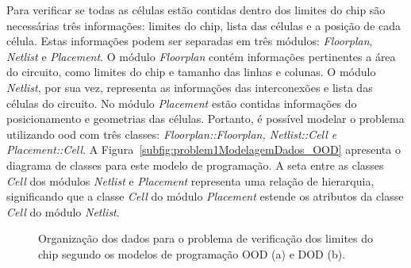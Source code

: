 Para verificar se todas as células estão contidas dentro dos limites do chip são necessárias três informações: limites do chip, lista das células e a posição de cada célula.
Estas informações podem ser separadas em três módulos: \textit{Floorplan}, \textit{Netlist} e \textit{Placement}.
O módulo \textit{Floorplan} contém informações pertinentes a área do circuito, como limites do chip e tamanho das linhas e colunas.
O módulo \textit{Netlist}, por sua vez, representa as informações das interconexões e lista das células do circuito.
No módulo \textit{Placement} estão contidas informações do posicionamento e geometrias das células.
Portanto, é possível modelar o problema utilizando \ac{ood} com três classes: \textit{Floorplan::Floorplan, Netlist::Cell e Placement::Cell}.
A Figura~\ref{subfig:problem1ModelagemDados_OOD} apresenta o diagrama de classes para este modelo de programação.
A seta entre as classes \textit{Cell} dos módulos \textit{Netlist} e \textit{Placement} representa uma relação de hierarquia, significando que a classe \textit{Cell} do módulo \textit{Placement} estende os atributos da classe \textit{Cell} do módulo \textit{Netlist}.

\begin{figure}[h!t]
    \centering
    
    \caption[Organização dos dados estudo de caso 1]{Organização dos dados para o problema de verificação dos limites do chip segundo os modelos de programação OOD (a) e DOD (b).}
    \label{fig:problem1ModelagemDados}
\end{figure}

